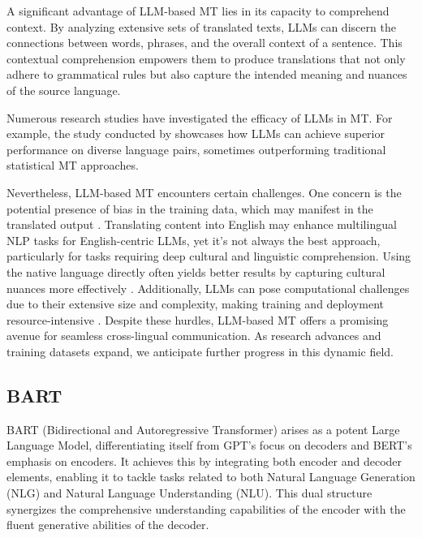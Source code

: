 A significant advantage of LLM-based MT lies in its capacity to comprehend context. By analyzing extensive sets of translated texts, LLMs can discern the connections between words, phrases, and the overall context of a sentence. This contextual comprehension empowers them to produce translations that not only adhere to grammatical rules but also capture the intended meaning and nuances of the source language.

Numerous research studies have investigated the efficacy of LLMs in MT. For example, the study conducted by  showcases how LLMs can achieve superior performance on diverse language pairs, sometimes outperforming traditional statistical MT approaches.

Nevertheless, LLM-based MT encounters certain challenges. One concern is the potential presence of bias in the training data, which may manifest in the translated output \cite{wang24}. 
Translating content into English may enhance multilingual NLP tasks for English-centric LLMs, yet it's not always the best approach, particularly for tasks requiring deep cultural and linguistic comprehension. 
Using the native language directly often yields better results by capturing cultural nuances more effectively \cite{liu24}.
Additionally, LLMs can pose computational challenges due to their extensive size and complexity, making training and deployment resource-intensive \cite{yang24}.
Despite these hurdles, LLM-based MT offers a promising avenue for seamless cross-lingual communication. As research advances and training datasets expand, we anticipate further progress in this dynamic field.

\subsection{BART}
BART (Bidirectional and Autoregressive Transformer) arises as a potent Large Language Model, differentiating itself from GPT's focus on decoders and BERT's emphasis on encoders. 
It achieves this by integrating both encoder and decoder elements, enabling it to tackle tasks related to both Natural Language Generation (NLG) and Natural Language Understanding (NLU). 
This dual structure synergizes the comprehensive understanding capabilities of the encoder with the fluent generative abilities of the decoder. 

